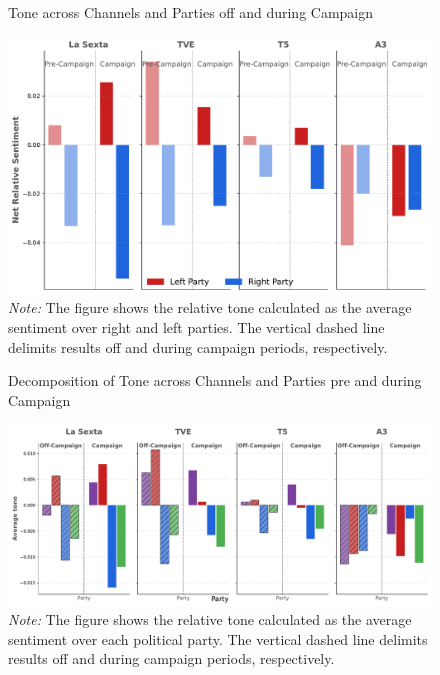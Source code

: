 \documentclass[12pt]{article}
\begin{document}
	
	
	
	\begin{figure}[!htb]
		\caption{Tone across Channels and Parties off and during Campaign }
		\centering
		\includegraphics[width=130mm]{figures/average_tone_pre_post_election}
		\caption*{\small \textit{Note:} The figure shows the relative tone calculated as the average sentiment over right and left parties. The vertical dashed line delimits results off and during campaign periods, respectively. }
		\label{fig:tone2}
	\end{figure}
	
	
	
	
	
	\begin{figure}[!htb]
		\caption{Decomposition of Tone across Channels and Parties pre and during Campaign }
		\centering
		\includegraphics[width=150mm]{figures/average_tone_pre_post_election_party}
		\caption*{\small \textit{Note:} The figure shows the relative tone calculated as the average sentiment over each political party. The vertical dashed line delimits results off and during campaign periods, respectively. }
		\label{fig:tone_by_party}
	\end{figure}
	
\end{document}
